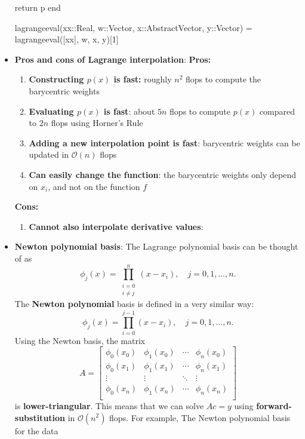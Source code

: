 \documentclass{report}
\begin{document}
\begin{itemize}
\begin{jlcode}
    return p  
end

lagrangeeval(xx::Real, w::Vector, x::AbstractVector, y::Vector) = lagrangeeval([xx], w, x, y)[1]
    \end{jlcode}
\item \textbf{Pros and cons of Lagrange interpolation}:
    \textbf{Pros:}
    \begin{enumerate}
        \item \textbf{Constructing $p(x)$ is fast:} roughly $n^2$ flops to compute the barycentric weights
        \item \textbf{Evaluating $p(x)$ is fast}: about $5n$ flops to compute $p(x)$ compared to $2n$ flops using Horner's Rule
        \item \textbf{Adding a new interpolation point is fast}: barycentric weights can be updated in $\mathcal{O}(n)$ flops
        \item \textbf{Can easily change the function}: the barycentric weights only depend on $x_i$, and not on the function $f$
    \end{enumerate}
    \textbf{Cons:}
    \begin{enumerate}
        \item \textbf{Cannot also interpolate derivative values}:
    \end{enumerate}
\item \textbf{Newton polynomial basis}: The Lagrange polynomial basis can be thought of as
    $$
    \phi_j(x) = \prod_{\substack{i = 0 \\ i \neq j}}^n (x - x_i), 
    \quad j = 0,1,\ldots,n.
    $$
    The \textbf{Newton polynomial} basis is defined in a very similar way:
    $$
    \phi_j(x) = \prod_{i = 0}^{j-1} (x - x_i), 
    \quad j = 0,1,\ldots,n.
    $$
    \bigbreak \noindent 
    Using the Newton basis, the matrix
    $$
    A = 
    \begin{bmatrix}
        \phi_0(x_0) & \phi_1(x_0) & \cdots & \phi_n(x_0)\\
        \phi_0(x_1) & \phi_1(x_1) & \cdots & \phi_n(x_1)\\
        \vdots & \vdots & \ddots & \vdots\\
        \phi_0(x_n) & \phi_1(x_n) & \cdots & \phi_n(x_n)\\
    \end{bmatrix}
    $$
    is \textbf{lower-triangular}. This means that we can solve $Ac = y$ using \textbf{forward-substitution} in $\mathcal{O}(n^2)$ flops.
    \bigbreak \noindent 
    For example, The Newton polynomial basis for the data
    \begin{align*}

\end{align*}
\end{itemize}
\end{document}
